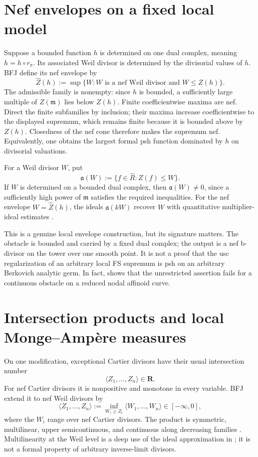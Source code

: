 \section{Nef envelopes on a fixed local model}
\label{sec:local-nef-envelopes}

Suppose a bounded function $h$ is determined on one dual complex, meaning
$h=h\circ r_\pi$.  Its associated Weil divisor is determined by the
divisorial values of $h$.  BFJ define its nef envelope by
\[
 \widehat Z(h)
 :=\sup\{W:W\text{ is a nef Weil divisor and }W\leq Z(h)\}.
\tag{70.18}\label{eq:local-nef-envelope}
\]
The admissible family is nonempty: since $h$ is bounded, a sufficiently
large multiple of $Z(\mathfrak m)$ lies below $Z(h)$.
Finite coefficientwise maxima are nef.  Direct the finite subfamilies by
inclusion; their maxima increase coefficientwise to the displayed
supremum, which remains finite because it is bounded above by $Z(h)$.
Closedness of the nef cone therefore makes the supremum nef.  Equivalently,
one obtains the largest formal psh function dominated by $h$ on
divisorial valuations.

For a Weil divisor $W$, put
\[
 \mathfrak a(W)
 :=\{f\in\widehat R:Z(f)\leq W\}.
\tag{70.19}\label{eq:local-envelope-ideal}
\]
If $W$ is determined on a bounded dual complex, then
$\mathfrak a(W)\neq0$, since a sufficiently high power of
$\mathfrak m$ satisfies the required inequalities.  For the nef envelope
$W=\widehat Z(h)$, the ideals $\mathfrak a(kW)$ recover $W$ with
quantitative multiplier-ideal estimates
\cite[Section~3.5, especially Proposition~3.18]{BFJ08}.

This is a genuine local envelope construction, but its signature matters.
The obstacle is bounded and carried by a fixed dual complex; the output is a
nef b-divisor on the tower over one smooth point.  It is not a proof that the
usc regularization of an arbitrary local FS supremum is psh on an arbitrary
Berkovich analytic germ.  In fact,
 shows that the unrestricted assertion
fails for a continuous obstacle on a reduced nodal affinoid curve.

\section{Intersection products and local Monge--Amp\`ere measures}
\label{sec:local-relative-ma}

On one modification, exceptional Cartier divisors have their usual
intersection number
\[
                         \langle Z_1,\ldots,Z_n\rangle\in\mathbf R.
\tag{70.20}\label{eq:local-cartier-intersection}
\]
For nef Cartier divisors it is nonpositive and monotone in every variable.
BFJ extend it to nef Weil divisors by
\[
 \langle Z_1,\ldots,Z_n\rangle
 :=\inf_{W_i\geq Z_i}
       \langle W_1,\ldots,W_n\rangle\in[-\infty,0],
\tag{70.21}\label{eq:local-nef-intersection}
\]
where the $W_i$ range over nef Cartier divisors.  The product is symmetric,
multilinear, upper semicontinuous, and continuous along decreasing families
\cite[Proposition~4.4]{BFJ08}.  Multilinearity at the Weil level is a deep use of
the ideal approximation in ; it is not a
formal property of arbitrary inverse-limit divisors.

